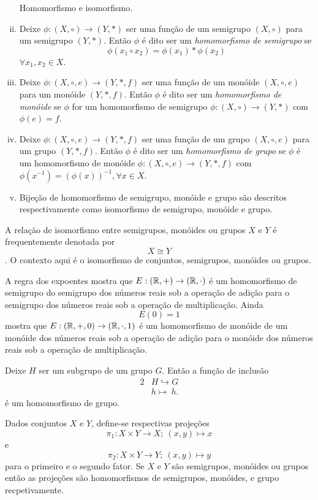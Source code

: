 \begin{definition}
  \begin{enumerate}[i.]
    Homomorfismo e isomorfismo.
    \item Deixe $\phi: (X, \circ) \to (Y, *)$ ser uma função de um semigrupo $(X, \circ)$ para um semigrupo $(Y,*)$. Então $\phi$ é dito ser um \emph{homomorfismo de semigrupo} se $$\phi(x_{1}\circ x_{2}) = \phi(x_{1}) * \phi(x_{2})$$ $\forall x_{1},x_{2} \in X$.
    \item Deixe $\phi: (X,\circ, e) \to (Y, *, f)$ ser uma função de um monóide $(X, \circ , e)$ para um monóide $(Y, *, f)$. Então $\phi$ é dito ser um \emph{homomorfismo de monóide} se $\phi$ for um homomorfismo de semigrupo $\phi: (X,\circ) \to (Y,*)$ com $\phi(e) = f$.
    \item Deixe $\phi: (X,\circ , e) \to (Y, *, f)$ ser uma função de um grupo $(X,\circ, e)$ para um grupo $(Y, *, f)$. Então $\phi$ é dito ser um \emph{homomorfismo de grupo} se $\phi$ é um homomorfismo de monóide $\phi: (X,\circ, e) \to (Y, *, f)$ com $\phi(x^{-1}) = (\phi(x))^{-1}, \forall x \in X$.
    \item Bijeção de homomorfismo de semigrupo, monóide e grupo são descritos respectivamente como isomorfismo de semigrupo, monóide e grupo.
  \end{enumerate}
  
\end{definition}
A relação de isomorfismo entre semigrupos, monóides ou grupos $X$ e $Y$ é frequentemente denotada por $$X\cong Y$$. O contexto aqui é o isomorfismo de conjuntos, semigrupos, monóides ou grupos.

\begin{exmp}
  A regra dos expoentes mostra que $E: (\mathbb{R}, +) \to (\mathbb{R},\cdot)$ é um homomorfismo de semigrupo do semigrupo dos números reais sob a operação de adição para o semigrupo dos números reais sob a operação de multiplicação. Ainda $$E(0)=1$$ mostra que $E: (\mathbb{R},+,0) \to (\mathbb{R},\cdot,1)$ é um homomorfismo de monóide de um monóide dos números reais sob a operação de adição para o monóide dos números reais sob a operação de multiplicação.
\end{exmp}
\begin{exmp}
  Deixe $H$ ser um subgrupo de um grupo $G$. Então a função de inclusão
  \begin{alignat}{2}
    &H \hookrightarrow G \nonumber\\
    &h \mapsto\ h.
    \nonumber
  \end{alignat}
  é um homomorfismo de grupo.
\end{exmp}
\begin{exmp}
  Dados conjuntos $X$ e $Y$, define-se respectivas projeções
  $$\pi_{1}: X\times Y \to X;\ (x,y)\mapsto x$$ e $$\pi_{2}: X\times Y \to Y;\ (x,y)\mapsto y$$
  para o primeiro e o segundo fator. Se $X$ e $Y$ são semigrupos, monóides ou grupos então as projeções são homomorfismos de semigrupos, monóides, e grupo recpetivamente.
\end{exmp}

